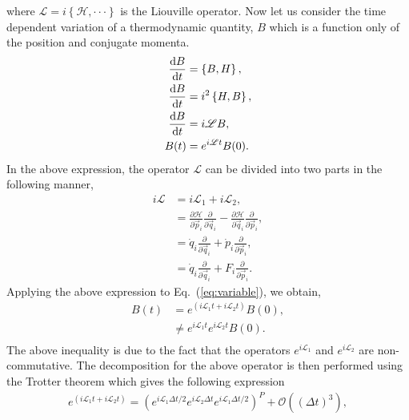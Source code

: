 \documentclass[a4paper]{article}
\begin{document}
where $\mathscr{L}=i\left\{\mathcal{H},\cdot\cdot\cdot\right\}$ is the Liouville operator. Now let us consider the time dependent variation of a thermodynamic quantity, $B$ which is a function only of the position and conjugate momenta.
\begin{equation}\label{eq:variable}
\begin{split}
\frac{{\rm d}B}{{\rm d}t}&=\left\{B,H\right\},\\
\frac{{\rm d}B}{{\rm d}t}&=i^{2}\left\{H,B\right\},\\
\frac{{\rm d}B}{{\rm d}t}&=i\mathscr{L}B,\\
B(t)&=e^{i\mathscr{L}t}B(0).
\end{split}
\end{equation}
In the above expression, the operator $\mathscr{L}$ can be divided into two parts in the following manner,
\begin{equation}
\begin{split}
i\mathscr{L}&=i\mathscr{L}_{1} + i\mathscr{L}_{2},\\
&=\frac{\partial \mathcal{H} }{\partial \vec{p}_{i}} \frac{\partial }{\partial \vec{q}_{i}} -\frac{\partial \mathcal{H} }{\partial \vec{q}_{i}} \frac{\partial }{\partial \vec{p}_{i}},\\
&=\dot{q}_{i}\frac{\partial }{\partial \vec{q}_{i}} + \dot{p}_{i}\frac{\partial }{\partial \vec{p}_{i}},\\
&=\dot{q}_{i}\frac{\partial }{\partial \vec{q}_{i}} + F_{i}\frac{\partial }{\partial \vec{p}_{i}}.
\end{split}
\end{equation}
Applying the above expression to Eq.~(\ref{eq:variable}), we obtain,
 \begin{equation}\label{eq:variable}
\begin{split}
B(t)&=e^{\left(i\mathscr{L}_{1}t+i\mathscr{L}_{2}t\right)}B(0),\\
&\neq e^{i\mathscr{L}_{1}t}e^{i\mathscr{L}_{2}t}B(0).\\
\end{split}
\end{equation}
The above inequality is due to the fact that the operators $e^{i\mathscr{L}_{1}}$ and $e^{i\mathscr{L}_{2}}$  are non-commutative. The decomposition for the above operator is then performed using the Trotter theorem which gives the following expression
\begin{equation}
\begin{split}
e^{\left(i\mathscr{L}_{1}t+i\mathscr{L}_{2}t\right)}=\left(e^{i\mathscr{L}_{1}\Delta t/2}e^{i\mathscr{L}_{2}\Delta t}e^{i\mathscr{L}_{1}\Delta t/2}\right)^{P} + \mathcal{O}\left((\Delta t)^{3}\right),
\end{split}
\end{equation}
\end{document}
